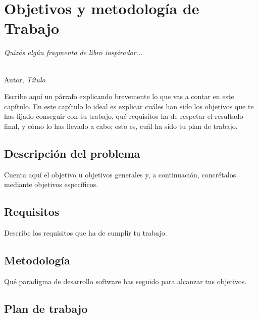 \chapter{Objetivos y metodología de Trabajo}
\label{cap:capitulo2}

\begin{flushright}
\begin{minipage}[]{10cm}
\emph{Quizás algún fragmento de libro inspirador...}\\
\end{minipage}\\

Autor, \textit{Título}\\
\end{flushright}

\vspace{1cm}

Escribe aquí un párrafo explicando brevemente lo que vas a contar en este capítulo. En este capítulo lo ideal es explicar cuáles han sido los objetivos que te has fijado conseguir con tu trabajo, qué requisitos ha de respetar el resultado final, y cómo lo has llevado a cabo; esto es, cuál ha sido tu plan de trabajo.\\

\section{Descripción del problema}
\label{sec:descripcion}

Cuenta aquí el objetivo u objetivos generales y, a continuación, concrétalos mediante objetivos específicos.

\section{Requisitos}
\label{sec:requisitos}

Describe los requisitos que ha de cumplir tu trabajo.

\section{Metodología}
\label{sec:metodologia}

Qué paradigma de desarrollo software has seguido para alcanzar tus objetivos.

\section{Plan de trabajo}
\label{sec:plantrabajo}






